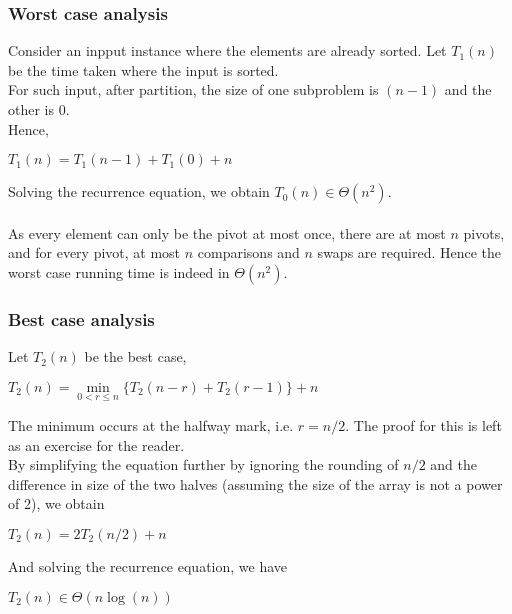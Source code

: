 \documentclass[a4paper]{article}
\begin{document}
\subsubsection{Worst case analysis}
Consider an inpput instance where the elements are already sorted. Let $T_1(n)$ be the time taken where the input is sorted.\\
For such input, after partition, the size of one subproblem is $(n-1)$ and the other is $0$.\\
Hence, 
\begin{center}
	$T_1(n) = T_1(n-1) + T_1(0) + n$
\end{center}
Solving the recurrence equation, we obtain $T_0(n) \in \Theta(n^2)$.\\ \\
As every element can only be the pivot at most once, there are at most $n$ pivots, and for every pivot, at most $n$ comparisons and $n$ swaps are required. Hence the worst case running time is indeed in $\Theta(n^2)$.
\subsubsection{Best case analysis}
Let $T_2(n)$ be the best case,
\begin{center}
	$T_2(n) = \min\limits_{0<r \le n}\{T_2(n-r) + T_2(r-1)\} + n$
\end{center}
The minimum occurs at the halfway mark, i.e. $r=n/2$. The proof for this is left as an exercise for the reader.\\
By simplifying the equation further by ignoring the rounding of $n/2$ and the difference in size of the two halves (assuming the size of the array is not a power of 2), we obtain
\begin{center}
	$T_2(n) = 2T_2(n/2) + n$
\end{center}
And solving the recurrence equation, we have
\begin{center}
	$T_2(n) \in \Theta(n \log(n))$
\end{center}
\end{document}
